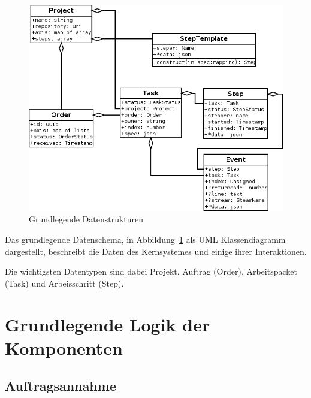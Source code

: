 \begin{figure}[ht] 
  \centering
  \label{fig:datenstrukturen}
  \includegraphics[width=\textwidth]{imageinput/datenstrukturen-step-templates.png}
  \caption{Grundlegende Datenstrukturen}
\end{figure}

Das grundlegende Datenschema, in Abbildung~\ref{fig:datenstrukturen} als UML Klassendiagramm dargestellt,
beschreibt die Daten des Kernsystemes und einige ihrer Interaktionen.

Die wichtigsten Datentypen sind dabei Projekt, Auftrag (Order), Arbeitspacket (Task) und Arbeisschritt (Step).




\section{Grundlegende Logik der Komponenten} %



\subsection{Auftragsannahme}


